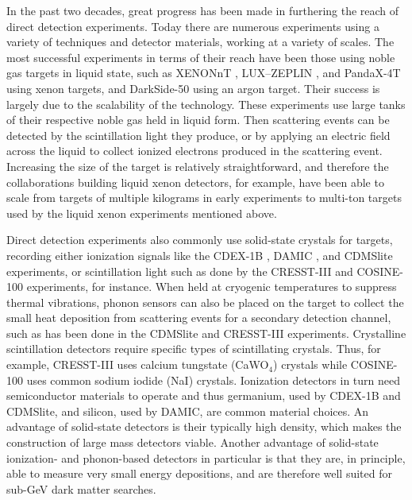 In the past two decades, great progress has been made in furthering the reach of direct detection experiments. Today there are numerous experiments using a variety of techniques and detector materials, working at a variety of scales. The most successful experiments in terms of their reach have been those using noble gas targets in liquid state, such as XENONnT \parencite{XENONnT2023}, LUX--ZEPLIN \parencite{LZ2024}, and PandaX-4T \parencite{PandaX2021} using xenon targets, and DarkSide-50 \parencite{DarkSide2023} using an argon target. Their success is largely due to the scalability of the technology. These experiments use large tanks of their respective noble gas held in liquid form. Then scattering events can be detected by the scintillation light they produce, or by applying an electric field across the liquid to collect ionized electrons produced in the scattering event. Increasing the size of the target is relatively straightforward, and therefore the collaborations building liquid xenon detectors, for example, have been able to scale from targets of multiple kilograms in early experiments to multi-ton targets used by the liquid xenon experiments mentioned above.

Direct detection experiments also commonly use solid-state crystals for targets, recording either ionization signals like the CDEX-1B \parencite{CDEX2019}, DAMIC \parencite{DAMIC2020}, and CDMSlite \parencite{CDMSlite2018} experiments, or scintillation light such as done by the CRESST-III \parencite{CRESSTIII2019} and COSINE-100 \parencite{COSINE1002018} experiments, for instance. When held at cryogenic temperatures to suppress thermal vibrations, phonon sensors can also be placed on the target to collect the small heat deposition from scattering events for a secondary detection channel, such as has been done in the CDMSlite and CRESST-III experiments. Crystalline scintillation detectors require specific types of scintillating crystals. Thus, for example, CRESST-III uses calcium tungstate (CaWO$_4$) crystals while COSINE-100 uses common sodium iodide (NaI) crystals. Ionization detectors in turn need semiconductor materials to operate and thus germanium, used by CDEX-1B and CDMSlite, and silicon, used by DAMIC, are common material choices. An advantage of solid-state detectors is their typically high density, which makes the construction of large mass detectors viable. Another advantage of solid-state ionization- and phonon-based detectors in particular is that they are, in principle, able to measure very small energy depositions, and are therefore well suited for sub-GeV dark matter searches.

